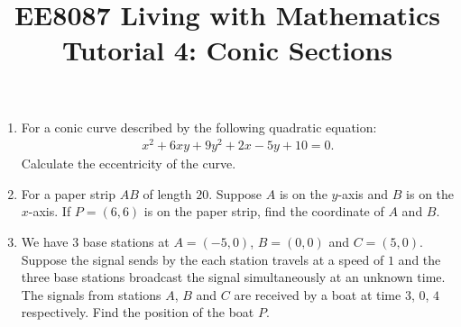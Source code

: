 \documentclass{article}
\title{EE8087 Living with Mathematics\\Tutorial 4: Conic Sections}
\date{}
\begin{document}
 \maketitle
\begin{enumerate}
\item For a conic curve described by the following quadratic equation:
  \begin{align*}
    x^2 + 6xy+9y^2 + 2x - 5y + 10=0. 
  \end{align*}
  Calculate the eccentricity of the curve.

\item For a paper strip $AB$ of length $20$. Suppose $A$ is on the $y$-axis and $B$ is on the $x$-axis. If $P = (6,6)$ is on the paper strip, find the coordinate of $A$ and $B$.
\begin{figure}[ht]
  \centering
\end{figure}

\item We have 3 base stations at $A = (-5,0)$, $B = (0,0)$ and $C = (5,0)$. Suppose the signal sends by the each station travels at a speed of $1$ and the three base stations broadcast the signal simultaneously at an unknown time. The signals from stations $A$, $B$ and $C$ are received by a boat at time $3$, $0$, $4$ respectively. Find the position of the boat $P$.

  \begin{figure}[ht]
    \centering
\end{figure}
\end{enumerate}
\end{document}
